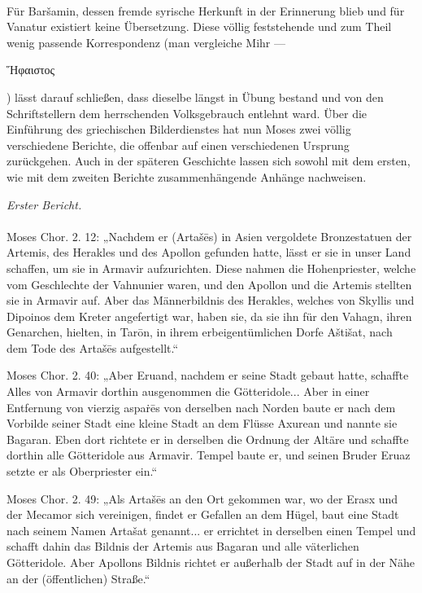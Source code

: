 \documentclass{article}
\begin{document}
\paragraph{}
Für Baršamin, dessen fremde syrische Herkunft in der Erinnerung blieb und für Vanatur existiert keine Übersetzung. Diese völlig feststehende und zum Theil wenig passende Korrespondenz (man vergleiche Mihr — \begin{greek}Ἥφαιστος\end{greek}) lässt darauf schließen, dass dieselbe längst in Übung bestand und von den Schriftstellern dem herrschenden Volksgebrauch entlehnt ward. Über die Einführung des griechischen Bilderdienstes hat nun Moses zwei völlig verschiedene Berichte, die offenbar auf einen verschiedenen Ursprung zurückgehen. Auch in der späteren Geschichte lassen sich sowohl mit dem ersten, wie mit dem zweiten Berichte zusammenhängende Anhänge nachweisen.
\begin{center}
\emph{Erster Bericht.}
\end{center}
\paragraph{}
Moses Chor. 2. 12: „Nachdem er (Artašēs) in Asien vergoldete Bronzestatuen der Artemis, des Herakles und des Apollon gefunden hatte, lässt er sie in unser Land schaffen, um sie in Armavir aufzurichten. Diese nahmen die Hohenpriester, welche vom Geschlechte der Vahnunier waren, und den Apollon und die Artemis stellten sie in Armavir auf. Aber das Männerbildnis des Herakles, welches von Skyllis und Dipoinos dem Kreter angefertigt war, haben sie, da sie ihn für den Vahagn, ihren Genarchen, hielten, in Tarōn, in ihrem erbeigentümlichen Dorfe Aštišat, nach dem Tode des Artašēs aufgestellt.“

Moses Chor. 2. 40: „Aber Eruand, nachdem er seine Stadt gebaut hatte, schaffte Alles von Armavir dorthin ausgenommen die Götteridole... Aber in einer Entfernung von vierzig aspaṙēs von derselben nach Norden baute er nach dem Vorbilde seiner Stadt eine kleine Stadt an dem Flüsse Axurean und nannte sie Bagaran. Eben dort richtete er in derselben die Ordnung der Altäre und schaffte dorthin alle Götteridole aus Armavir. Tempel baute er, und seinen Bruder Eruaz setzte er als Oberpriester ein.“

Moses Chor. 2. 49: „Als Artašēs an den Ort gekommen war, wo der Erasx und der Mecamor sich vereinigen, findet er Gefallen an dem Hügel, baut eine Stadt nach seinem Namen Artašat genannt... er errichtet in derselben einen Tempel und schafft dahin das Bildnis der Artemis aus Bagaran und alle väterlichen Götteridole. Aber Apollons Bildnis richtet er außerhalb der Stadt auf in der Nähe an der (öffentlichen) Straße.“
\end{document}
